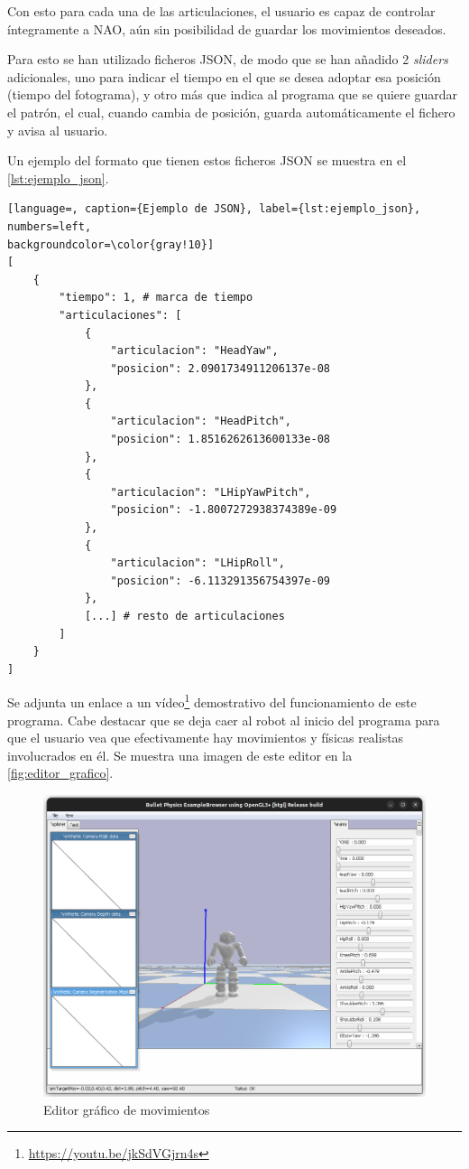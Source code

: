 Con esto para cada una de las articulaciones, el usuario es capaz de controlar íntegramente a NAO, aún sin posibilidad de guardar los movimientos deseados.

Para esto se han utilizado ficheros JSON, de modo que se han añadido 2 \textit{sliders} adicionales, uno para indicar el tiempo en el que se desea adoptar esa posición (tiempo del fotograma), y otro más que indica al programa que se quiere guardar el patrón, el cual, cuando cambia de posición, guarda automáticamente el fichero y avisa al usuario.

Un ejemplo del formato que tienen estos ficheros JSON se muestra en el \autoref{lst:ejemplo_json}.

\begin{lstlisting}[language=, caption={Ejemplo de JSON}, label={lst:ejemplo_json}, numbers=left, 
backgroundcolor=\color{gray!10}]    
[
    {
        "tiempo": 1, # marca de tiempo
        "articulaciones": [
            {
                "articulacion": "HeadYaw",
                "posicion": 2.0901734911206137e-08
            },
            {
                "articulacion": "HeadPitch",
                "posicion": 1.8516262613600133e-08
            },
            {
                "articulacion": "LHipYawPitch",
                "posicion": -1.8007272938374389e-09
            },
            {
                "articulacion": "LHipRoll",
                "posicion": -6.113291356754397e-09
            },
            [...] # resto de articulaciones
        ]
    }
]
\end{lstlisting}

Se adjunta un enlace a un vídeo\footnote{\url{https://youtu.be/jkSdVGjrn4s}} demostrativo del funcionamiento de este programa. Cabe destacar que se deja caer al robot al inicio del programa para que el usuario vea que efectivamente hay movimientos y físicas realistas involucrados en él. Se muestra una imagen de este editor en la \autoref{fig:editor_grafico}.

\begin{figure}[H]
  \centering
  \includegraphics[width=1\textwidth]{figures/cap_4/editor.png}
  \caption{Editor gráfico de movimientos}
  \label{fig:editor_grafico}
\end{figure}

